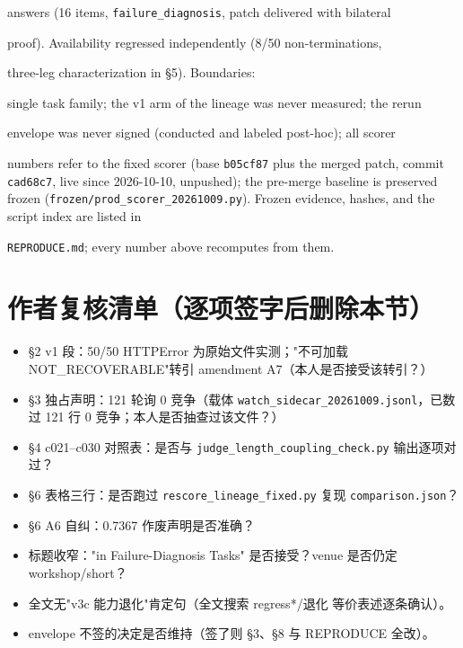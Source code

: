 \documentclass[11pt,a4paper]{article}
\begin{document}
answers (16 items, \texttt{failure\_diagnosis}, patch delivered with bilateral

proof). Availability regressed independently (8/50 non-terminations,

three-leg characterization in §5). Boundaries:

single task family; the v1 arm of the lineage was never measured; the rerun

envelope was never signed (conducted and labeled post-hoc); all scorer

numbers refer to the fixed scorer (base \texttt{b05cf87} plus the merged patch, commit \texttt{cad68c7}, live since 2026-10-10, unpushed); the pre-merge baseline is preserved frozen (\texttt{frozen/prod\_scorer\_20261009.py}). Frozen evidence, hashes, and the script index are listed in

\texttt{REPRODUCE.md}; every number above recomputes from them.

\section*{作者复核清单（逐项签字后删除本节）}
\begin{itemize}
\item  §2 v1 段：50/50 HTTPError 为原始文件实测；"不可加载 NOT\_RECOVERABLE"转引 amendment A7（本人是否接受该转引？）
\item  §3 独占声明：121 轮询 0 竞争（载体 \texttt{watch\_sidecar\_20261009.jsonl}，已数过 121 行 0 竞争；本人是否抽查过该文件？）
\item  §4 c021–c030 对照表：是否与 \texttt{judge\_length\_coupling\_check.py} 输出逐项对过？
\item  §6 表格三行：是否跑过 \texttt{rescore\_lineage\_fixed.py} 复现 \texttt{comparison.json}？
\item  §6 A6 自纠：0.7367 作废声明是否准确？
\item  标题收窄："in Failure-Diagnosis Tasks" 是否接受？venue 是否仍定 workshop/short？
\item  全文无"v3c 能力退化"肯定句（全文搜索 regress*/退化 等价表述逐条确认）。
\item  envelope 不签的决定是否维持（签了则 §3、§8 与 REPRODUCE 全改）。
\end{itemize}
\end{document}
